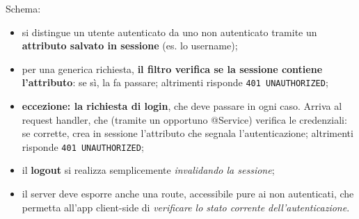 Schema:
\begin{itemize}
  \item si distingue un utente autenticato da uno non autenticato tramite un
        \textbf{attributo salvato in sessione} (es. lo username);
  \item per una generica richiesta, \textbf{il filtro verifica se la sessione contiene
        l'attributo}: se s\`i, la fa passare; altrimenti risponde
        \texttt{401 UNAUTHORIZED};
  \item \textbf{eccezione: la richiesta di login}, che deve passare in ogni caso. Arriva al
        request handler, che (tramite un opportuno @Service) verifica le credenziali: se
        corrette, crea in sessione l'attributo che segnala l'autenticazione; altrimenti
        risponde \texttt{401 UNAUTHORIZED};
  \item il \textbf{logout} si realizza semplicemente \emph{invalidando la sessione};
  \item il server deve esporre anche una route, accessibile pure ai non autenticati, che
        permetta all'app client-side di \emph{verificare lo stato corrente
        dell'autenticazione}.
\end{itemize}
